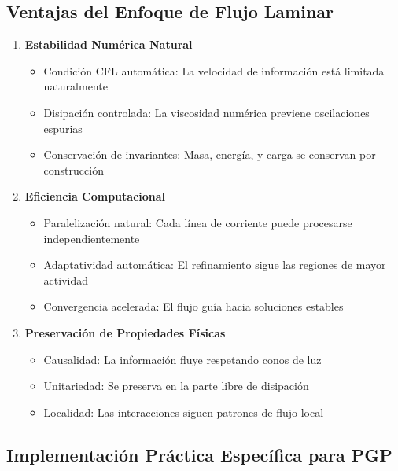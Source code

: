 \documentclass{book}
\begin{document}
\subsection*{Ventajas del Enfoque de Flujo Laminar}
\begin{enumerate}
    \item \textbf{Estabilidad Numérica Natural}
    \begin{itemize}
        \item Condición CFL automática: La velocidad de información está limitada naturalmente
        \item Disipación controlada: La viscosidad numérica previene oscilaciones espurias
        \item Conservación de invariantes: Masa, energía, y carga se conservan por construcción
    \end{itemize}
    \item \textbf{Eficiencia Computacional}
    \begin{itemize}
        \item Paralelización natural: Cada línea de corriente puede procesarse independientemente
        \item Adaptatividad automática: El refinamiento sigue las regiones de mayor actividad
        \item Convergencia acelerada: El flujo guía hacia soluciones estables
    \end{itemize}
    \item \textbf{Preservación de Propiedades Físicas}
    \begin{itemize}
        \item Causalidad: La información fluye respetando conos de luz
        \item Unitariedad: Se preserva en la parte libre de disipación
        \item Localidad: Las interacciones siguen patrones de flujo local
    \end{itemize}
\end{enumerate}
\subsection*{Implementación Práctica Específica para PGP}
\end{document}

